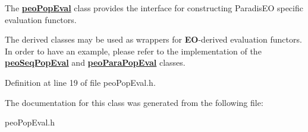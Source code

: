 The {\bf \hyperlink{classpeoPopEval}{peo\-Pop\-Eval}} class provides the interface for constructing Paradis\-EO specific evaluation functors. 

The derived classes may be used as wrappers for {\bf EO}-derived evaluation functors. In order to have an example, please refer to the implementation of the {\bf \hyperlink{classpeoSeqPopEval}{peo\-Seq\-Pop\-Eval}} and {\bf \hyperlink{classpeoParaPopEval}{peo\-Para\-Pop\-Eval}} classes. 



Definition at line 19 of file peo\-Pop\-Eval.h.

The documentation for this class was generated from the following file:\begin{CompactItemize}
\item 
peo\-Pop\-Eval.h\end{CompactItemize}

